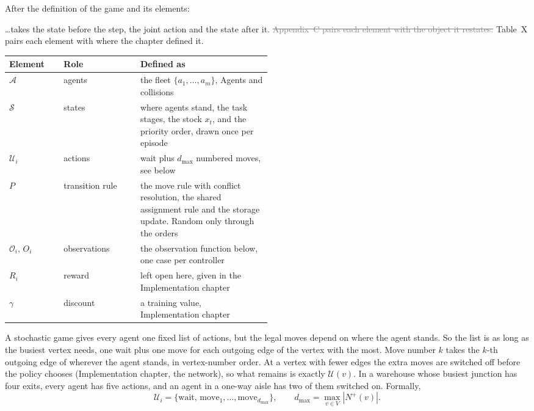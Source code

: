\documentclass[11pt,a4paper]{article}
\newcommand{\new}[1]{\textcolor{newc}{#1}}
\newcommand{\old}[1]{\textcolor{gray}{\sout{#1}}}
\newenvironment{greenblock}{\color{newc}}{}
\begin{document}
After the definition of the game and its elements:

\dots takes the state before the step, the joint action and the state after
it. \old{Appendix~C pairs each element with the object it restates.}
\new{Table~X pairs each element with where the chapter defined it.}

\begin{greenblock}
\begin{center}
\small
\begin{tabular}{llp{0.5\linewidth}}
  \toprule
  Element & Role & Defined as \\
  \midrule
  $\mathcal{A}$   & agents            & the fleet $\{a_1,\dots,a_m\}$, Agents and collisions \\
  $\mathcal{S}$   & states            & where agents stand, the task stages, the stock $x_t$, and the priority order, drawn once per episode \\
  $\mathcal{U}_i$ & actions           & wait plus $d_{\max}$ numbered moves, see below \\
  $P$             & transition rule   & the move rule with conflict resolution, the shared assignment rule and the storage update. Random only through the orders \\
  $\mathcal{O}_i$, $O_i$ & observations & the observation function below, one case per controller \\
  $R_i$           & reward            & left open here, given in the Implementation chapter \\
  $\gamma$        & discount          & a training value, Implementation chapter \\
  \bottomrule
\end{tabular}
\end{center}

A stochastic game gives every agent one fixed list of actions, but the legal
moves depend on where the agent stands. So the list is as long as the
busiest vertex needs, one wait plus one move for each outgoing edge of the
vertex with the most. Move number $k$ takes the $k$-th outgoing edge of
wherever the agent stands, in vertex-number order. At a vertex with fewer
edges the extra moves are switched off before the policy chooses
(Implementation chapter, the network), so what remains is exactly $\mathcal{U}(v)$. In a warehouse
whose busiest junction has four exits, every agent has five actions, and an
agent in a one-way aisle has two of them switched on. Formally,
\[
  \mathcal{U}_i = \{\mathrm{wait},\, \mathrm{move}_1, \dots, \mathrm{move}_{d_{\max}}\},
  \qquad d_{\max} = \max_{v \in V} |N^{+}(v)| .
  \tag{action list}
\]
\end{greenblock}
\end{document}
